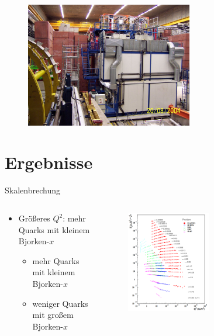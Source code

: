 \documentclass[aspectratio=1610, 9pt]{beamer}
\begin{document}
\begin{frame}
  \begin{figure}
    \centering
    \includegraphics[width=0.65\textwidth]{images/H1_detector.jpg}
  \end{figure}
\end{frame}


\section{Ergebnisse}

\begin{frame}{Skalenbrechung}
  \begin{columns}
    \begin{column}{0.3\textwidth}
      \begin{itemize}
        \item{Größeres $Q^2$: mehr Quarks mit kleinem Bjorken-$x$}
        \begin{itemize}
          \item{mehr Quarks mit kleinem Bjorken-$x$}
          \item{weniger Quarks mit großem Bjorken-$x$}
        \end{itemize}
      \end{itemize}
    \end{column}

    \begin{column}{0.7\textwidth}
      \begin{figure}
        \centering
        \includegraphics[width=0.55\textwidth]{images/Skalen.png}
      \end{figure}
    \end{column}
  \end{columns}
\end{frame}
\end{document}
